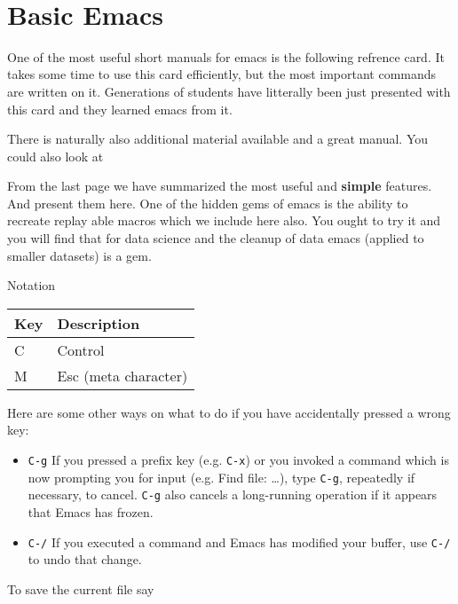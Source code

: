 
\FILENAME\

\section{Basic Emacs}
\label{C:emacs}

One of the most useful short manuals for emacs is the following refrence
card. It takes some time to use this card efficiently, but the most
important commands are written on it. Generations of students have
litterally been just presented with this card and they learned emacs
from it.



There is naturally also additional material available and a great
manual. You could also look at



From the last page we have summarized the most useful and
\textbf{simple} features. And present them here. One of the hidden gems
of emacs is the ability to recreate replay able macros which we include
here also. You ought to try it and you will find that for data science
and the cleanup of data emacs (applied to smaller datasets) is a gem.

Notation

\begin{longtable}[]{@{}ll@{}}
\toprule
Key & Description\tabularnewline
\midrule
\endhead
C & Control\tabularnewline
M & Esc (meta character)\tabularnewline
\bottomrule
\end{longtable}

Here are some other ways on what to do if you have accidentally
pressed a wrong key:

\begin{itemize}
\item \verb|C-g| If you pressed a prefix key (e.g. \verb|C-x|) or you invoked
a command which is now prompting you for input (e.g. Find file:
\ldots{}), type \verb|C-g|, repeatedly if necessary, to cancel. \verb|C-g| also
cancels a long-running operation if it appears that Emacs has frozen.

\item \verb|C-/| If you executed a command and Emacs has modified your buffer, use \verb|C-/| to
undo that change. 
\end{itemize}

To save the current file say 

